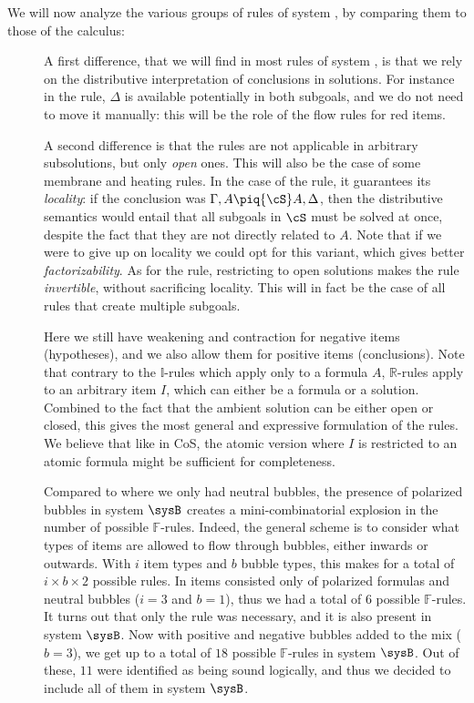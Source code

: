 We will now analyze the various groups of rules of system , by
comparing them to those of the  calculus:
\begin{description}
  \item[\textbf{\identity}] 
  A first difference, that we will find in most rules of system , is that
  we rely on the distributive interpretation of conclusions in solutions. For
  instance in the  rule, $\Delta$ is available potentially in
  both subgoals, and we do not need to move it manually: this will be the role
  of the flow rules for red items.
  
  A second difference is that the rules are not applicable in arbitrary
  subsolutions, but only \emph{open} ones. This will also be the case of some
  membrane and heating rules. In the case of the  rule, it
  guarantees its \emph{locality}: if the conclusion was $\Gamma, A \piq{\cS} A,
  \Delta$, then the distributive semantics would entail that all subgoals in
  $\cS$ must be solved at once, despite the fact that they are not directly
  related to $A$. Note that if we were to give up on locality we could opt for
  this variant, which gives better \emph{factorizability}. As for the
   rule, restricting to open solutions makes the rule
  \emph{invertible}, without sacrificing locality. This will in fact be the case
  of all rules that create multiple subgoals.

  \item[\textbf{\resource}] 
  Here we still have weakening and contraction for negative items (hypotheses),
  and we also allow them for positive items (conclusions). Note that contrary to
  the $\mathbb{I}$-rules which apply only to a formula $A$, $\mathbb{R}$-rules
  apply to an arbitrary item $I$, which can either be a formula or a solution.
  Combined to the fact that the ambient solution can be either open or closed,
  this gives the most general and expressive formulation of the rules. We
  believe that like in CoS, the atomic version where $I$ is restricted to an
  atomic formula might be sufficient for completeness.

  \item[\textbf{\flow}]

  Compared to  where we only had neutral bubbles, the presence of
  polarized bubbles in system $\sysB$ creates a mini-combinatorial explosion in
  the number of possible $\mathbb{F}$-rules. Indeed, the general scheme is to
  consider what types of items are allowed to flow through bubbles, either
  inwards or outwards. With $i$ item types and $b$ bubble types, this makes for
  a total of $i \times b \times 2$ possible rules. In  items consisted
  only of polarized formulas and neutral bubbles ($i = 3$ and $b = 1$), thus we
  had a total of $6$ possible $\mathbb{F}$-rules. It turns out that only the
   rule was necessary, and it is also present in system
  $\sysB$. Now with positive and negative bubbles added to the mix ($b = 3$), we
  get up to a total of $18$ possible $\mathbb{F}$-rules in system $\sysB$. Out
  of these, $11$ were identified as being sound logically, and thus we decided
  to include all of them in system $\sysB$.


\end{description}

